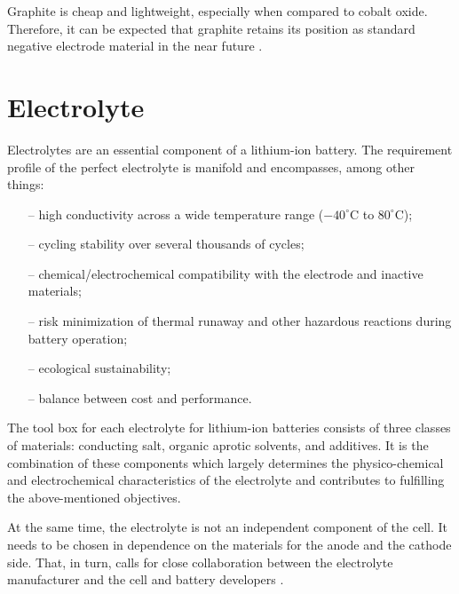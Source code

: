 Graphite is cheap and lightweight, especially when compared to cobalt oxide. Therefore, it can be expected that graphite retains its position as standard negative electrode material in the near future \cite{korthauer2018lithium}.

\section{Electrolyte}
\label{sec:electrolyte}
Electrolytes are an essential component of a lithium-ion battery. The requirement profile of the perfect electrolyte is manifold and encompasses, among other things:
\begin{itemize}
    \item[--] high conductivity across a wide temperature range ($-40^\circ$C to $80^\circ$C);
    \item[--] cycling stability over several thousands of cycles;
    \item[--] chemical/electrochemical compatibility with the electrode and inactive materials;
    \item[--] risk minimization of thermal runaway and other hazardous reactions during battery operation;
    \item[--] ecological sustainability;
    \item[--] balance between cost and performance.
\end{itemize}
The tool box for each electrolyte for lithium-ion batteries consists of three classes of materials: conducting salt, organic aprotic solvents, and additives. It is the combination of these components which largely determines the physico-chemical and electrochemical characteristics of the electrolyte and contributes to fulfilling the above-mentioned objectives. 

At the same time, the electrolyte is not an independent component of the cell. It needs to be chosen in dependence on the materials for the anode and the cathode side. That, in turn, calls for close collaboration between the electrolyte manufacturer and the cell and battery developers \cite{korthauer2018lithium}.

